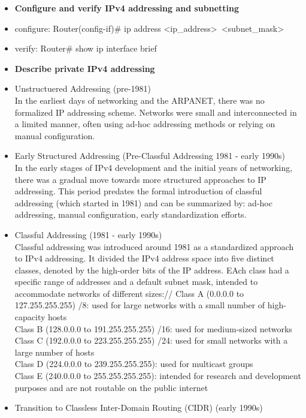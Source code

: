 \documentclass{article}
\begin{document}
\begin{itemize}
  
  \item \textbf{Configure and verify IPv4 addressing and subnetting}
  	\item[] configure: Router(config-if)\# ip address \textless ip\_address\textgreater\ \textless subnet\_mask\textgreater
  	\item[] verify: Router\# show ip interface brief
  
  \item \textbf{Describe private IPv4 addressing}
  	\item[] Unstructuered Addressing (pre-1981)\\
		In the earliest days of networking and the ARPANET, there was no formalized IP addressing scheme. Networks were small and interconnected in a limited manner, often using ad-hoc addressing methods or relying on manual configuration.
	\item[] Early Structured Addressing (Pre-Classful Addressing 1981 - early 1990s)\\
		In the early stages of IPv4 development and the initial years of networking, there was a gradual move towards more structured approaches to IP addressing. This period predates the formal introduction of classful addressing (which started in 1981) and can be summarized by: ad-hoc addressing, manual configuration, early standardization efforts.
	\item[] Classful Addressing (1981 - early 1990s)\\
		Classful addressing was introduced around 1981 as a standardized approach to IPv4 addressing. It divided the IPv4 address space into five distinct classes, denoted by the high-order bits of the IP address. EAch class had a specific range of addresses and a default subnet mask, intended to accommodate networks of different sizes://
		Class A (0.0.0.0 to 127.255.255.255) /8: used for large networks with a small number of high-capacity hosts\\
		Class B (128.0.0.0 to 191.255.255.255) /16: used for medium-sized networks\\
		Class C (192.0.0.0 to 223.255.255.255) /24: used for small networks with a large number of hosts\\
		Class D (224.0.0.0 to 239.255.255.255): used for multicast groups\\
		Class E (240.0.0.0 to 255.255.255.255): intended for research and development purposes and are not routable on the public internet
	\item[] Transition to Classless Inter-Domain Routing (CIDR) (early 1990s)\\

\end{itemize}
\end{document}
